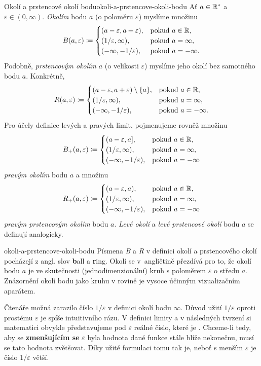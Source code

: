 \begin{definition}{Okolí a prstencové okolí bodu}{okoli-a-prstencove-okoli-bodu}
Ať $a \in \mathbb{R}^*$ a $\varepsilon \in (0,\infty)$. \emph{Okolím} bodu $a$ (o
poloměru $\varepsilon$) myslíme množinu
\[
 B(a,\varepsilon) \coloneqq \begin{cases}
  (a-\varepsilon,a+\varepsilon), & \text{pokud } a \in \mathbb{R},\\
  (1 / \varepsilon, \infty), &\text{pokud } a = \infty,\\
  (-\infty,-1 / \varepsilon), &\text{pokud } a = -\infty.
 \end{cases}
\]
Podobně, \emph{prstencovým okolím} $a$ (o velikosti $\varepsilon$) myslíme jeho
okolí bez samotného bodu $a$. Konkrétně,
\[
 R(a,\varepsilon) \coloneqq \begin{cases}
  (a-\varepsilon,a+\varepsilon) \setminus \{a\}, &\text{pokud }a \in \mathbb{R},\\
  (1 / \varepsilon,\infty), & \text{pokud } a = \infty,\\
  (-\infty,-1 / \varepsilon), &\text{pokud } a = -\infty.
 \end{cases}
\]
Pro účely definice levých a pravých limit, pojmenujeme rovněž množinu
\[
 B_+(a,\varepsilon) \coloneqq \begin{cases}
  (a-\varepsilon,a], &\text{pokud }a \in \mathbb{R},\\
  (1 / \varepsilon,\infty), &\text{pokud }a = \infty,\\
  (-\infty,-1 / \varepsilon), &\text{pokud }a = -\infty
 \end{cases}
\]
\emph{pravým okolím} bodu $a$ a množinu
\[
 R_+(a,\varepsilon) \coloneqq \begin{cases}
  (a-\varepsilon,a), &\text{pokud }a \in \mathbb{R},\\
  (1 / \varepsilon,\infty), &\text{pokud }a = \infty,\\
  (-\infty,-1 / \varepsilon), &\text{pokud }a = -\infty
 \end{cases}
\]
\emph{pravým prstencovým okolím} bodu $a$. \emph{Levé okolí} a \emph{levé
prstencové okolí} bodu $a$ se definují analogicky.
\end{definition}

\begin{remark}{}{okoli-a-prstencove-okoli-bodu}
 Písmena \emph{B} a \emph{R} v definici okolí a prstencového okolí pocházejí z
 angl. slov \textbf{b}all a \textbf{r}ing. Okolí se v~angličtině přezdívá
  pro to, že okolí bodu $a$ je ve skutečnosti (jednodimenzionální) kruh
 s poloměrem $\varepsilon$ o středu $a$. Znázornění okolí bodu jako kruhu v
 rovině je vysoce účinným vizualizačním aparátem.

 Čtenáře možná zarazilo číslo $1 / \varepsilon$ v definici okolí bodu $\infty$.
 Důvod užití $1 / \varepsilon$ oproti prostému $\varepsilon$ je spíše
 intuitivního rázu. V definici limity a v následných tvrzení si matematici
 obvykle představujeme pod $\varepsilon$ reálné číslo, které je . Chceme-li tedy, aby se \textbf{zmenšujícím se} $\varepsilon$ byla
 hodnota dané funkce stále blíže nekonečnu, musí se tato hodnota zvětšovat. Díky
 užité formulaci tomu tak je, neboť s menším $\varepsilon$ je číslo $1 /
 \varepsilon$ větší.
\end{remark}

